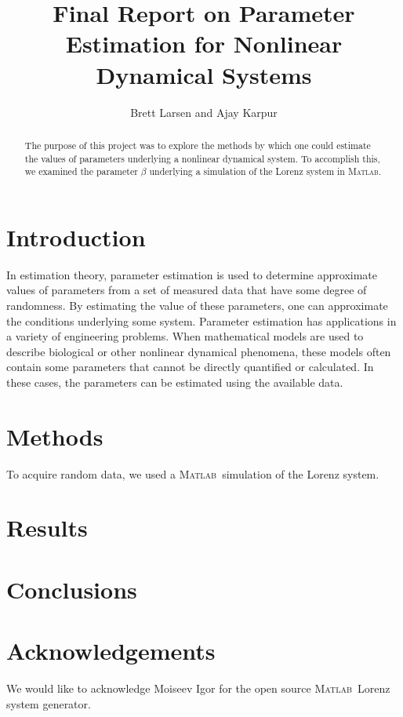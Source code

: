 \documentclass{article}[11pt]
\title{Final Report on Parameter Estimation for Nonlinear Dynamical Systems}
\author{Brett Larsen and Ajay Karpur}
\date{}
\newcommand{\Matlab}{\textsc{Matlab}}
\begin{document}
\maketitle
\doublespace


\begin{abstract}
The purpose of this project was to explore the methods by which one could estimate the values of parameters underlying a nonlinear dynamical system. To accomplish this, we examined the parameter $\beta$ underlying a simulation of the Lorenz system in \Matlab.
\end{abstract}

\section{Introduction}
\label{sec:intro}
In estimation theory, parameter estimation is used to determine approximate values of parameters from a set of measured data that have some degree of randomness. By estimating the value of these parameters, one can approximate the conditions underlying some system. Parameter estimation has applications in a variety of engineering problems. When mathematical models are used to describe biological or other nonlinear dynamical phenomena, these models often contain some parameters that cannot be directly quantified or calculated. In these cases, the parameters can be estimated using the available data.





\section{Methods}
\label{sec:methods}

To acquire random data, we used a \Matlab \ simulation of the Lorenz system.


\section{Results}
\label{sec:results}

 

\section{Conclusions}
\label{sec:conclusion}


\section{Acknowledgements}
\label{sec:Ack}
We would like to acknowledge Moiseev Igor for the open source \Matlab \ Lorenz system generator.




\end{document}
